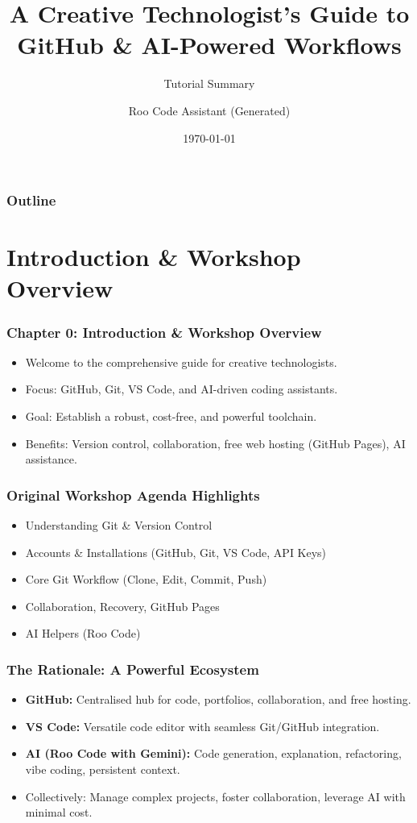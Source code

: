 \documentclass{beamer}
\title[Creative Tech Guide]{A Creative Technologist's Guide to GitHub & AI-Powered Workflows}
\subtitle{Tutorial Summary}
\author{Roo Code Assistant (Generated)}
\date{\today}
\institute{Derived from the Workshop Tutorial}
\begin{document}
\begin{frame}
  \titlepage
\end{frame}

\begin{frame}
  \frametitle{Outline}
  \tableofcontents
\end{frame}


\section{Introduction & Workshop Overview}
\begin{frame}
  \frametitle{Chapter 0: Introduction & Workshop Overview}
  \begin{itemize}
    \item Welcome to the comprehensive guide for creative technologists.
    \item Focus: GitHub, Git, VS Code, and AI-driven coding assistants.
    \item Goal: Establish a robust, cost-free, and powerful toolchain.
    \item Benefits: Version control, collaboration, free web hosting (GitHub Pages), AI assistance.
  \end{itemize}
\end{frame}

\begin{frame}
  \frametitle{Original Workshop Agenda Highlights}
  \begin{itemize}
    \item Understanding Git & Version Control
    \item Accounts & Installations (GitHub, Git, VS Code, API Keys)
    \item Core Git Workflow (Clone, Edit, Commit, Push)
    \item Collaboration, Recovery, GitHub Pages
    \item AI Helpers (Roo Code)
  \end{itemize}
\end{frame}

\begin{frame}
  \frametitle{The Rationale: A Powerful Ecosystem}
  \begin{itemize}
    \item \textbf{GitHub:} Centralised hub for code, portfolios, collaboration, and free hosting.
    \item \textbf{VS Code:} Versatile code editor with seamless Git/GitHub integration.
    \item \textbf{AI (Roo Code with Gemini):} Code generation, explanation, refactoring, vibe coding, persistent context.
    \item Collectively: Manage complex projects, foster collaboration, leverage AI with minimal cost.
  \end{itemize}
\end{frame}
\end{document}
